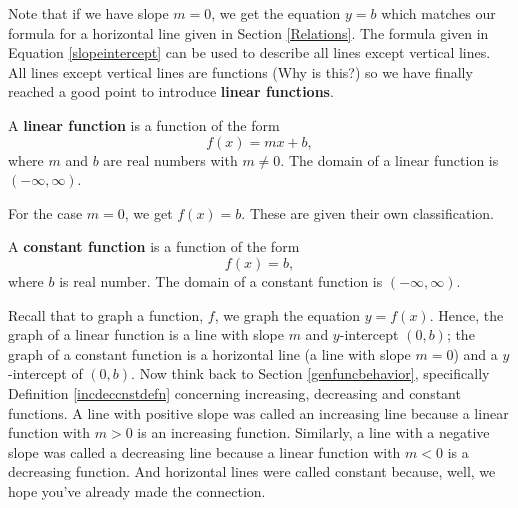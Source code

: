 \smallskip

Note that if we have slope $m = 0$, we get the equation $y = b$ which matches our formula for a horizontal line given in Section \ref{Relations}.  The formula given in Equation \ref{slopeintercept} can be used to describe all lines except vertical lines.  All lines except vertical lines are functions (Why is this?) so we have finally reached a good point to introduce \textbf{linear functions}.

\smallskip

\colorbox{ResultColor}{\bbm

\begin{defn} \label{linearfunction} A \textbf{linear function} is a function of the form \[ f(x) = mx + b,\] where $m$ and $b$ are real numbers with $m \neq 0$.  The domain of a linear function is $(-\infty, \infty)$.

\end{defn}

\ebm}

\smallskip

For the case $m=0$, we get $f(x) = b$.  These are given their own classification.

\smallskip

\colorbox{ResultColor}{\bbm

\begin{defn} \label{constantfunction} A \textbf{constant function} is a function of the form \[ f(x) =  b,\] where $b$ is real number.  The domain of a constant function is $(-\infty, \infty)$.

\end{defn}

\ebm}

\smallskip

Recall that to graph a function, $f$, we graph the equation $y=f(x)$. Hence, the graph of a linear function is a line with slope $m$ and $y$-intercept $(0,b)$; the graph of a constant function is a horizontal line (a line with slope $m = 0$) and a $y$-intercept of $(0,b)$.  Now think back to Section \ref{genfuncbehavior}, specifically Definition \ref{incdeccnstdefn} concerning increasing, decreasing and constant functions.  A line with positive slope was called an increasing line because a linear function with $m > 0$ is an increasing function.  Similarly, a line with a negative slope was called a decreasing line because a linear function with $m < 0$ is a decreasing function.  And horizontal lines were called constant because, well, we hope you've already made the connection.  

